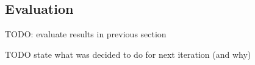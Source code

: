 \subsection{Evaluation}

TODO: evaluate results in previous section

TODO state what was decided to do for next iteration (and why)
